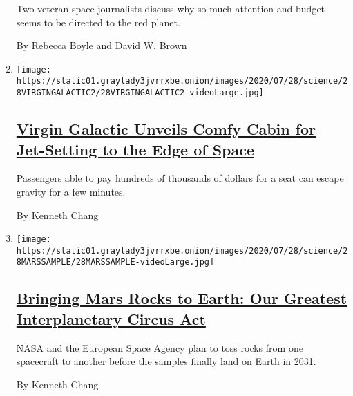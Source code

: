 \begin{enumerate}
  Two veteran space journalists discuss why so much attention and budget
  seems to be directed to the red planet.

  By Rebecca Boyle and David W. Brown
\item
  \texttt{[image: https://static01.graylady3jvrrxbe.onion/images/2020/07/28/science/28VIRGINGALACTIC2/28VIRGINGALACTIC2-videoLarge.jpg]}

  \hypertarget{virgin-galactic-unveils-comfy-cabin-for-jet-setting-to-the-edge-of-space}{%
  \subsection{\texorpdfstring{\href{/2020/07/28/science/virgin-galactic-cabin.html}{Virgin
  Galactic Unveils Comfy Cabin for Jet-Setting to the Edge of
  Space}}{Virgin Galactic Unveils Comfy Cabin for Jet-Setting to the Edge of Space}}\label{virgin-galactic-unveils-comfy-cabin-for-jet-setting-to-the-edge-of-space}}

  Passengers able to pay hundreds of thousands of dollars for a seat can
  escape gravity for a few minutes.

  By Kenneth Chang
\item
  \texttt{[image: https://static01.graylady3jvrrxbe.onion/images/2020/07/28/science/28MARSSAMPLE/28MARSSAMPLE-videoLarge.jpg]}

  \hypertarget{bringing-mars-rocks-to-earth-our-greatest-interplanetary-circus-act}{%
  \subsection{\texorpdfstring{\href{/2020/07/28/science/mars-sample-return-mission.html}{Bringing
  Mars Rocks to Earth: Our Greatest Interplanetary Circus
  Act}}{Bringing Mars Rocks to Earth: Our Greatest Interplanetary Circus Act}}\label{bringing-mars-rocks-to-earth-our-greatest-interplanetary-circus-act}}

  NASA and the European Space Agency plan to toss rocks from one
  spacecraft to another before the samples finally land on Earth in
  2031.

  By Kenneth Chang
\end{enumerate}

